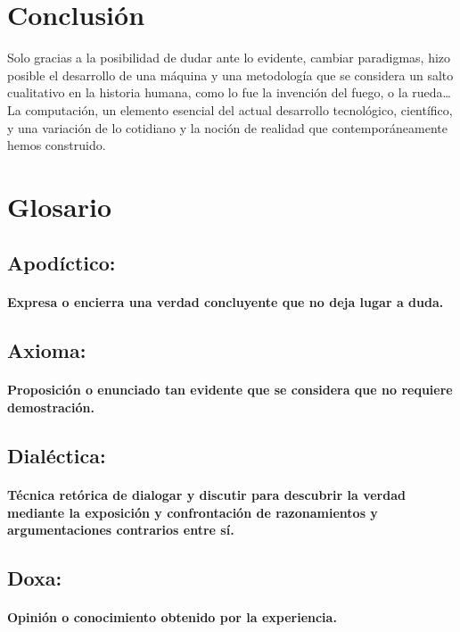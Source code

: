 \documentclass{report}   %
\begin{document}
\section{Conclusión}

Solo gracias a la posibilidad de dudar ante lo evidente, cambiar paradigmas, hizo posible el desarrollo de una máquina y una metodología que se considera un salto cualitativo en la historia humana, como lo fue la invención del fuego, o la rueda… La computación, un elemento esencial del actual desarrollo tecnológico, científico, y una variación de lo cotidiano y la noción de realidad que contemporáneamente hemos construido.

\section{Glosario}
    \subsection{Apodíctico: }
       \paragraph{Expresa o encierra una verdad concluyente que no deja lugar a duda.}
    \subsection{Axioma: }
        \paragraph{ Proposición o enunciado tan evidente que se considera que no requiere demostración.}
    \subsection{Dialéctica: }
        \paragraph{Técnica retórica de dialogar y discutir para descubrir la verdad mediante la exposición y confrontación de razonamientos y argumentaciones contrarios entre sí.}
    \subsection{Doxa:}
        \paragraph{ Opinión o conocimiento obtenido por la experiencia.}
\end{document}
